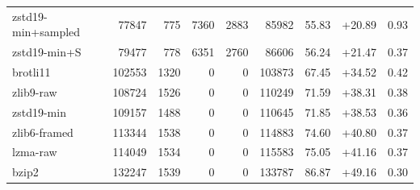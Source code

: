 \begin{table}[h]
\begin{tabular}{lrrrrrrrr}
zstd19-min+sampled & 77847 & 775 & 7360 & 2883 & 85982 & 55.83 & +20.89 & 0.93 \\
zstd19-min+S & 79477 & 778 & 6351 & 2760 & 86606 & 56.24 & +21.47 & 0.37 \\
brotli11 & 102553 & 1320 & 0 & 0 & 103873 & 67.45 & +34.52 & 0.42 \\
zlib9-raw & 108724 & 1526 & 0 & 0 & 110249 & 71.59 & +38.31 & 0.38 \\
zstd19-min & 109157 & 1488 & 0 & 0 & 110645 & 71.85 & +38.53 & 0.36 \\
zlib6-framed & 113344 & 1538 & 0 & 0 & 114883 & 74.60 & +40.80 & 0.37 \\
lzma-raw & 114049 & 1534 & 0 & 0 & 115583 & 75.05 & +41.16 & 0.37 \\
bzip2 & 132247 & 1539 & 0 & 0 & 133787 & 86.87 & +49.16 & 0.30 \\
\bottomrule\end{tabular}\end{table}
